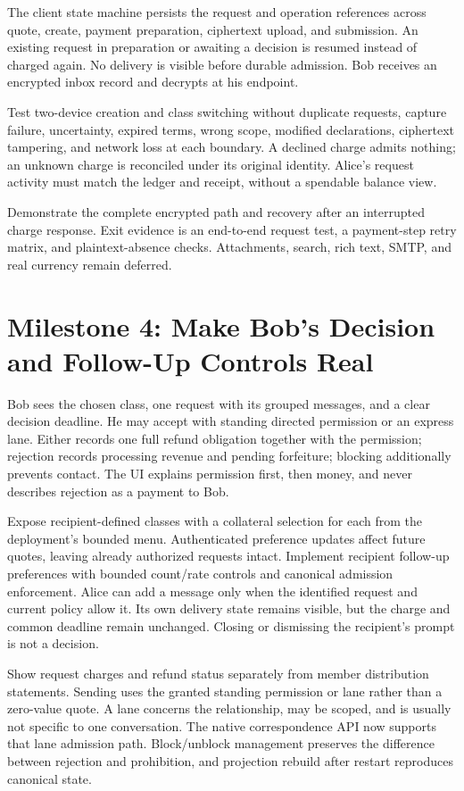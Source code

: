 \documentclass[11pt]{article}
\begin{document}
The client state machine persists the request and operation references across
quote, create, payment preparation, ciphertext upload, and submission. An existing
request in preparation or awaiting a decision is resumed instead of charged again. No delivery is
visible before durable admission. Bob receives an encrypted inbox record and
decrypts at his endpoint.

Test two-device creation and class switching without duplicate requests, capture failure, uncertainty,
expired terms, wrong scope, modified declarations, ciphertext tampering, and
network loss at each boundary. A declined charge admits nothing; an unknown
charge is reconciled under its original identity. Alice's request activity must
match the ledger and receipt, without a spendable balance view.

Demonstrate the complete encrypted path and recovery after an interrupted charge
response. Exit evidence is an end-to-end request test, a payment-step retry
matrix, and plaintext-absence checks. Attachments, search, rich text, SMTP, and
real currency remain deferred.

\section{Milestone 4: Make Bob's Decision and Follow-Up Controls Real}

Bob sees the chosen class, one request with its grouped messages, and a clear
decision deadline. He may accept with standing directed permission or an express
lane. Either records one full refund obligation together with the permission;
rejection records processing revenue and pending forfeiture; blocking additionally
prevents contact. The UI explains permission first, then money, and never
describes rejection as a payment to Bob.

Expose recipient-defined classes with a collateral selection for each from the
deployment's bounded menu. Authenticated preference updates affect future quotes,
leaving already authorized
requests intact. Implement recipient follow-up preferences with bounded count/rate controls and
canonical admission enforcement. Alice can add a message only when the identified
request and current policy allow it. Its own delivery state remains visible, but
the charge and common deadline remain unchanged. Closing or dismissing the
recipient's prompt is not a decision.

Show request charges and refund status separately from member distribution
statements. Sending uses the granted standing permission or lane rather than a
zero-value quote. A lane concerns the relationship, may be scoped, and is usually
not specific to one conversation. The native correspondence API now supports
that lane admission path. Block/unblock management preserves the difference between rejection and
prohibition, and projection rebuild after restart reproduces canonical state.
\end{document}
